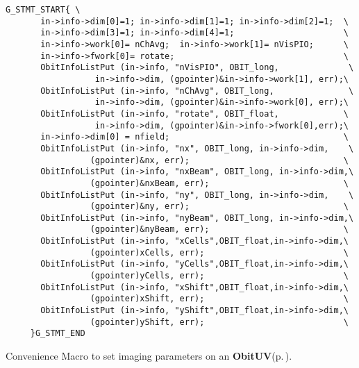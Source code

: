 \footnotesize\begin{verbatim}G_STMT_START{ \
       in->info->dim[0]=1; in->info->dim[1]=1; in->info->dim[2]=1;  \
       in->info->dim[3]=1; in->info->dim[4]=1;                      \
       in->info->work[0]= nChAvg;  in->info->work[1]= nVisPIO;      \
       in->info->fwork[0]= rotate;                                  \
       ObitInfoListPut (in->info, "nVisPIO", OBIT_long,              \
                  in->info->dim, (gpointer)&in->info->work[1], err);\
       ObitInfoListPut (in->info, "nChAvg", OBIT_long,               \
                  in->info->dim, (gpointer)&in->info->work[0], err);\
       ObitInfoListPut (in->info, "rotate", OBIT_float,             \
                  in->info->dim, (gpointer)&in->info->fwork[0],err);\
       in->info->dim[0] = nfield;                                   \
       ObitInfoListPut (in->info, "nx", OBIT_long, in->info->dim,    \
                 (gpointer)&nx, err);                               \
       ObitInfoListPut (in->info, "nxBeam", OBIT_long, in->info->dim,\
                 (gpointer)&nxBeam, err);                           \
       ObitInfoListPut (in->info, "ny", OBIT_long, in->info->dim,    \
                 (gpointer)&ny, err);                               \
       ObitInfoListPut (in->info, "nyBeam", OBIT_long, in->info->dim,\
                 (gpointer)&nyBeam, err);                           \
       ObitInfoListPut (in->info, "xCells",OBIT_float,in->info->dim,\
                 (gpointer)xCells, err);                            \
       ObitInfoListPut (in->info, "yCells",OBIT_float,in->info->dim,\
                 (gpointer)yCells, err);                            \
       ObitInfoListPut (in->info, "xShift",OBIT_float,in->info->dim,\
                 (gpointer)xShift, err);                            \
       ObitInfoListPut (in->info, "yShift",OBIT_float,in->info->dim,\
                 (gpointer)yShift, err);                            \
     }G_STMT_END
\end{verbatim}\normalsize 
Convenience Macro to set imaging parameters on an {\bf Obit\-UV}{\rm (p.\,\pageref{structObitUV})}. 

